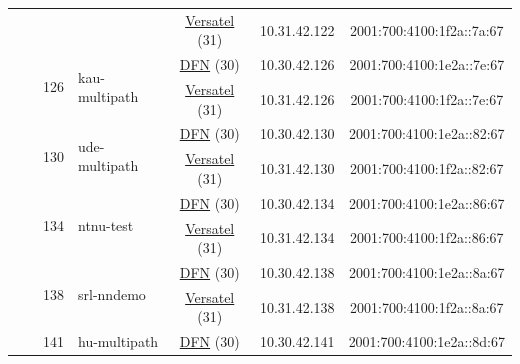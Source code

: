 \begin{small}
\begin{center}
\begin{longtable}{|c|c|c|c|c|c|c|c|}
  &  &  &  & \multicolumn{2}{|c|}{\tiny{\href{http://www.versatel.de}{Versatel} (31)}} & \tiny{10.31.42.122} & \tiny{2001:700:4100:1f2a::7a:67} \\* \cline{3-3}\cline{4-4}\cline{5-5}\cline{6-6}\cline{7-7}\cline{8-8}
  &  & \multirow{2}{*}{\tiny{126}} & \multicolumn{1}{|l|}{\multirow{2}{*}{\tiny{kau-multipath}}} & \multicolumn{2}{|c|}{\tiny{\href{https://www.dfn.de}{DFN} (30)}} & \tiny{10.30.42.126} & \tiny{2001:700:4100:1e2a::7e:67} \\* \cline{5-5}\cline{6-6}\cline{7-7}\cline{8-8}
  &  &  &  & \multicolumn{2}{|c|}{\tiny{\href{http://www.versatel.de}{Versatel} (31)}} & \tiny{10.31.42.126} & \tiny{2001:700:4100:1f2a::7e:67} \\* \cline{3-3}\cline{4-4}\cline{5-5}\cline{6-6}\cline{7-7}\cline{8-8}
  &  & \multirow{2}{*}{\tiny{130}} & \multicolumn{1}{|l|}{\multirow{2}{*}{\tiny{ude-multipath}}} & \multicolumn{2}{|c|}{\tiny{\href{https://www.dfn.de}{DFN} (30)}} & \tiny{10.30.42.130} & \tiny{2001:700:4100:1e2a::82:67} \\* \cline{5-5}\cline{6-6}\cline{7-7}\cline{8-8}
  &  &  &  & \multicolumn{2}{|c|}{\tiny{\href{http://www.versatel.de}{Versatel} (31)}} & \tiny{10.31.42.130} & \tiny{2001:700:4100:1f2a::82:67} \\* \cline{3-3}\cline{4-4}\cline{5-5}\cline{6-6}\cline{7-7}\cline{8-8}
  &  & \multirow{2}{*}{\tiny{134}} & \multicolumn{1}{|l|}{\multirow{2}{*}{\tiny{ntnu-test}}} & \multicolumn{2}{|c|}{\tiny{\href{https://www.dfn.de}{DFN} (30)}} & \tiny{10.30.42.134} & \tiny{2001:700:4100:1e2a::86:67} \\* \cline{5-5}\cline{6-6}\cline{7-7}\cline{8-8}
  &  &  &  & \multicolumn{2}{|c|}{\tiny{\href{http://www.versatel.de}{Versatel} (31)}} & \tiny{10.31.42.134} & \tiny{2001:700:4100:1f2a::86:67} \\* \cline{3-3}\cline{4-4}\cline{5-5}\cline{6-6}\cline{7-7}\cline{8-8}
  &  & \multirow{2}{*}{\tiny{138}} & \multicolumn{1}{|l|}{\multirow{2}{*}{\tiny{srl-nndemo}}} & \multicolumn{2}{|c|}{\tiny{\href{https://www.dfn.de}{DFN} (30)}} & \tiny{10.30.42.138} & \tiny{2001:700:4100:1e2a::8a:67} \\* \cline{5-5}\cline{6-6}\cline{7-7}\cline{8-8}
  &  &  &  & \multicolumn{2}{|c|}{\tiny{\href{http://www.versatel.de}{Versatel} (31)}} & \tiny{10.31.42.138} & \tiny{2001:700:4100:1f2a::8a:67} \\* \cline{3-3}\cline{4-4}\cline{5-5}\cline{6-6}\cline{7-7}\cline{8-8}
  &  & \multirow{2}{*}{\tiny{141}} & \multicolumn{1}{|l|}{\multirow{2}{*}{\tiny{hu-multipath}}} & \multicolumn{2}{|c|}{\tiny{\href{https://www.dfn.de}{DFN} (30)}} & \tiny{10.30.42.141} & \tiny{2001:700:4100:1e2a::8d:67} \\* \cline{5-5}\cline{6-6}\cline{7-7}\cline{8-8}

\end{longtable}
\end{center}
\end{small}
